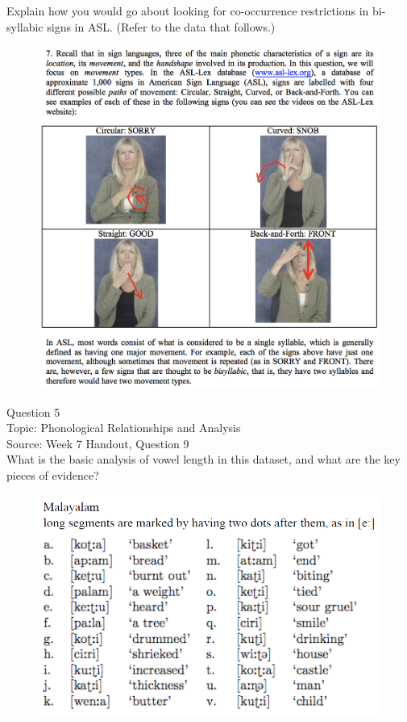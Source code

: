 \documentclass[12pt]{article}
\begin{document}
Explain how you would go about looking for co-occurrence restrictions in bi-syllabic signs in ASL. (Refer to the data that follows.)\\

\begin{figure}[H]
\includegraphics{../images/ASL_movement.png}
\end{figure}

\newpage

{\large Question 5}\\

Topic: Phonological Relationships and Analysis\\
Source: Week 7 Handout, Question 9\\

What is the basic analysis of vowel length in this dataset, and what are the key pieces of evidence?\\

\begin{figure}[H]
\includegraphics{../images/malayalam.png}
\end{figure}
\end{document}
